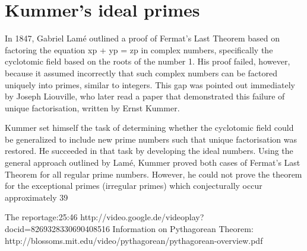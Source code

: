 \documentclass[12pt, a4paper, twoside]{article}
\numberwithin{equation}{section}
\begin{document}
\section{Kummer's ideal primes}
In 1847, Gabriel Lamé outlined a proof of Fermat's Last Theorem based on factoring the equation xp + yp = zp in complex numbers, specifically the cyclotomic field based on the roots of the number 1. His proof failed, however, because it assumed incorrectly that such complex numbers can be factored uniquely into primes, similar to integers. This gap was pointed out immediately by Joseph Liouville, who later read a paper that demonstrated this failure of unique factorisation, written by Ernst Kummer.

Kummer set himself the task of determining whether the cyclotomic field could be generalized to include new prime numbers such that unique factorisation was restored. He succeeded in that task by developing the ideal numbers. Using the general approach outlined by Lamé, Kummer proved both cases of Fermat's Last Theorem for all regular prime numbers. However, he could not prove the theorem for the exceptional primes (irregular primes) which conjecturally occur approximately 39%

The reportage:25:46 
http://video.google.de/videoplay?docid=8269328330690408516
Information on Pythagorean Theorem:
http://blossoms.mit.edu/video/pythagorean/pythagorean-overview.pdf
\end{document}
